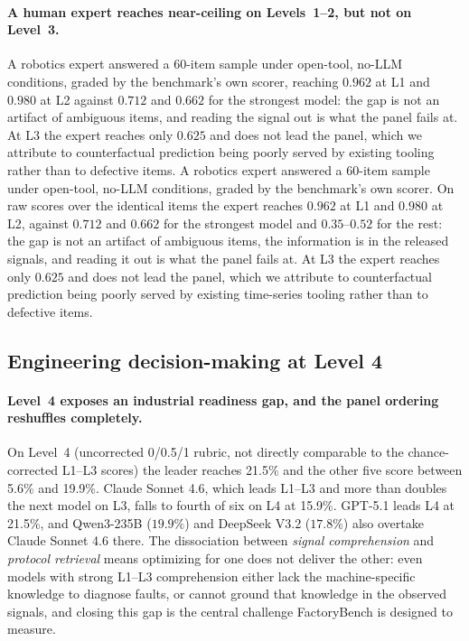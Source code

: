 \paragraph{A human expert reaches near-ceiling on Levels~1--2, but not on Level~3.}
\ifworkshopcompact
A robotics expert answered a $60$-item sample under open-tool, no-LLM conditions, graded by the benchmark's own scorer, reaching $0.962$ at L1 and $0.980$ at L2 against $0.712$ and $0.662$ for the strongest model: the gap is not an artifact of ambiguous items, and reading the signal out is what the panel fails at. At L3 the expert reaches only $0.625$ and does not lead the panel, which we attribute to counterfactual prediction being poorly served by existing tooling rather than to defective items.
\else
A robotics expert answered a $60$-item sample under open-tool, no-LLM conditions, graded by the benchmark's own scorer. On raw scores over the identical items the expert reaches $0.962$ at L1 and $0.980$ at L2, against $0.712$ and $0.662$ for the strongest model and $0.35$--$0.52$ for the rest: the gap is not an artifact of ambiguous items, the information is in the released signals, and reading it out is what the panel fails at. At L3 the expert reaches only $0.625$ and does not lead the panel, which we attribute to counterfactual prediction being poorly served by existing time-series tooling rather than to defective items.
\fi

\subsection{Engineering decision-making at Level 4}
\label{subsec:l4}

\paragraph{Level~4 exposes an industrial readiness gap, and the panel ordering reshuffles completely.}
On Level~4 (uncorrected 0/0.5/1 rubric, not directly comparable to the chance-corrected L1--L3 scores) the leader reaches 21.5\% and the other five score between 5.6\% and 19.9\%. Claude Sonnet 4.6, which leads L1--L3 and more than doubles the next model on L3, falls to fourth of six on L4 at 15.9\%. GPT-5.1 leads L4 at 21.5\%, and Qwen3-235B ($19.9\%$) and DeepSeek V3.2 ($17.8\%$) also overtake Claude Sonnet 4.6 there. The dissociation between \emph{signal comprehension} and \emph{protocol retrieval} means optimizing for one does not deliver the other: even models with strong L1--L3 comprehension either lack the machine-specific knowledge to diagnose faults, or cannot ground that knowledge in the observed signals, and closing this gap is the central challenge FactoryBench is designed to measure.

